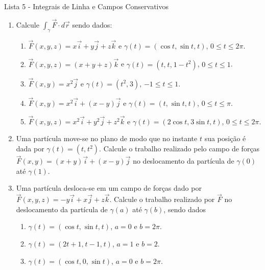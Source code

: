 \documentclass[11pt,a4paper]{article}
\begin{document}
	\begin{center}
		\Large Lista 5 - Integrais de Linha e Campos Conservativos
	\end{center}
	

	\begin{enumerate}
	
	\item Calcule $\displaystyle\int_\gamma \vec{F} \cdot d\vec{r}$ sendo dados:
	
	\begin{enumerate}
	\item $\vec{F}(x,y,z) = x\vec{i} + y\vec{j} + z\vec{k}$ e $\gamma (t) = (\cos t \textrm{,}\ \sin t \textrm{,}\ t)$, $0 \leq t \leq 2\pi$.
	\item $\vec{F}(x,y,z) = (x + y + z)\vec{k}$ e $\gamma (t) = (t \textrm{,}\ t \textrm{,}\ 1 - t^2)$, $0 \leq t \leq 1$.
	\item $\vec{F}(x,y) = x^2\vec{j}$ e $\gamma (t) = (t^2 \textrm{,}\ 3)$, $-1 \leq t \leq 1$.
	\item $\vec{F}(x,y) = x^2\vec{i} + (x - y)\vec{j}$ e $\gamma (t) = (t \textrm{,}\ \sin t \textrm{,}\ t)$, $0 \leq t \leq \pi$.
	\item $\vec{F}(x,y,z) = x^2\vec{i} + y^2\vec{j} + z^2\vec{k}$ e $\gamma (t) = (2\cos t \textrm{,}\ 3\sin t \textrm{,}\ t)$, $0 \leq t \leq 2\pi$.
	
	\end{enumerate}

\item Uma partícula move-se no plano de modo que no instante $t$ sua posição é dada por $\gamma (t) = (t \textrm{,}\ t^2)$. Calcule o trabalho realizado pelo campo de forças $\vec{F}(x,y) = (x + y)\vec{i} + (x - y)\vec{j}$ no deslocamento da partícula de $\gamma (0)$ até $\gamma (1)$.

\item Uma partícula desloca-se em um campo de forças dado por $\vec{F}(x,y,z) = -y\vec{i} + x\vec{j} + z\vec{k}$. Calcule o trabalho realizado por $\vec{F}$ no deslocamento da partícula de $\gamma (a)$ até $\gamma (b)$, sendo dados

\begin{enumerate}

\item $\gamma (t) = (\cos t \textrm{,}\ \sin t \textrm{,}\ t)$, $a = 0$ e $b = 2 \pi$.
\item $\gamma (t) = (2t + 1 \textrm{,}\ t - 1 \textrm{,}\ t)$, $a = 1$ e $b = 2 $.
\item $\gamma (t) = (\cos t \textrm{,}\ 0 \textrm{,}\ \sin t)$, $a = 0$ e $b = 2 \pi$.


\end{enumerate}
\end{enumerate}
\end{document}
